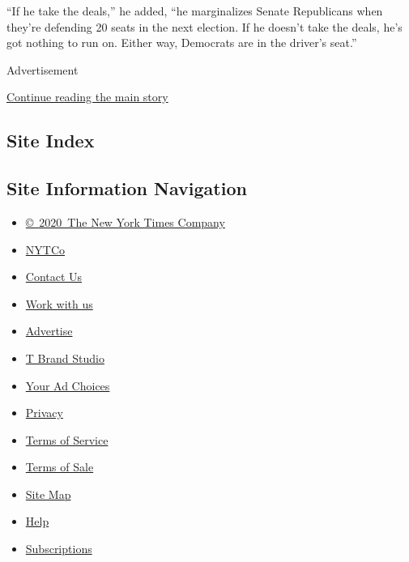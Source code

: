 ``If he take the deals,'' he added, ``he marginalizes Senate Republicans
when they're defending 20 seats in the next election. If he doesn't take
the deals, he's got nothing to run on. Either way, Democrats are in the
driver's seat.''

Advertisement

\protect\hyperlink{after-bottom}{Continue reading the main story}

\hypertarget{site-index}{%
\subsection{Site Index}\label{site-index}}

\hypertarget{site-information-navigation}{%
\subsection{Site Information
Navigation}\label{site-information-navigation}}

\begin{itemize}
\tightlist
\item
  \href{https://help.nytimes.com/hc/en-us/articles/115014792127-Copyright-notice}{©~2020~The
  New York Times Company}
\end{itemize}

\begin{itemize}
\tightlist
\item
  \href{https://www.nytco.com/}{NYTCo}
\item
  \href{https://help.nytimes.com/hc/en-us/articles/115015385887-Contact-Us}{Contact
  Us}
\item
  \href{https://www.nytco.com/careers/}{Work with us}
\item
  \href{https://nytmediakit.com/}{Advertise}
\item
  \href{http://www.tbrandstudio.com/}{T Brand Studio}
\item
  \href{https://www.nytimes.com/privacy/cookie-policy\#how-do-i-manage-trackers}{Your
  Ad Choices}
\item
  \href{https://www.nytimes.com/privacy}{Privacy}
\item
  \href{https://help.nytimes.com/hc/en-us/articles/115014893428-Terms-of-service}{Terms
  of Service}
\item
  \href{https://help.nytimes.com/hc/en-us/articles/115014893968-Terms-of-sale}{Terms
  of Sale}
\item
  \href{https://spiderbites.nytimes.com}{Site Map}
\item
  \href{https://help.nytimes.com/hc/en-us}{Help}
\item
  \href{https://www.nytimes.com/subscription?campaignId=37WXW}{Subscriptions}
\end{itemize}
